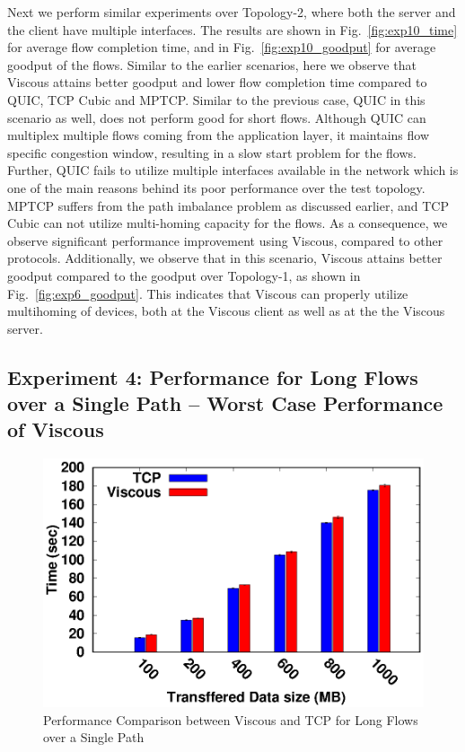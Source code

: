 Next we perform similar experiments over Topology-2, where both the server and the client have multiple interfaces. The results are shown in Fig.~\ref{fig:exp10_time} for average flow completion time, and in Fig.~\ref{fig:exp10_goodput} for average goodput of the flows. Similar to the earlier scenarios, here we observe that Viscous attains better goodput and lower flow completion time compared to QUIC, TCP Cubic and MPTCP. Similar to the previous case, QUIC in this scenario as well, does not perform good for short flows. Although QUIC can multiplex multiple flows coming from the application layer, it maintains flow specific congestion window, resulting in a slow start problem for the flows. Further, QUIC fails to utilize multiple interfaces available in the network which is one of the main reasons behind its poor performance over the test topology. MPTCP suffers from the path imbalance problem as discussed earlier, and TCP Cubic can not utilize multi-homing capacity for the flows. As a consequence, we observe significant performance improvement using Viscous, compared to other protocols. Additionally, we observe that in this scenario, Viscous attains better goodput compared to the goodput over Topology-1, as shown in Fig.~\ref{fig:exp6_goodput}. This indicates that Viscous can properly utilize multihoming of devices, both at the Viscous client as well as at the the Viscous server. 


\subsection{Experiment 4: Performance for Long Flows over a Single Path -- Worst Case Performance of Viscous}


\begin{figure}[!t]
	\centering
	\includegraphics[width=0.5\linewidth]{img/exp1/tcp-mpudp_res}
	\caption{Performance Comparison between Viscous and TCP for Long Flows over a Single Path}
	\label{fig:exp1_singlepath}
\end{figure}


